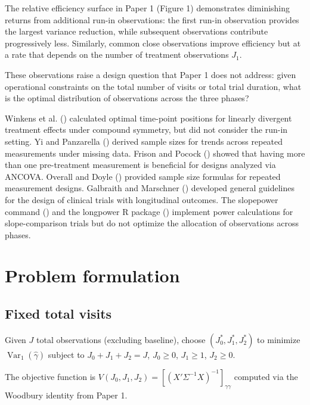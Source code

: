\documentclass[
  11pt,
]{article}
\begin{document}
The relative efficiency surface in Paper 1 (Figure 1) demonstrates
diminishing returns from additional run-in observations: the first
run-in observation provides the largest variance reduction, while
subsequent observations contribute progressively less. Similarly, common
close observations improve efficiency but at a rate that depends on the
number of treatment observations \(J_1\).

These observations raise a design question that Paper 1 does not
address: given operational constraints on the total number of visits or
total trial duration, what is the optimal distribution of observations
across the three phases?

Winkens et al. () calculated optimal
time-point positions for linearly divergent treatment effects under
compound symmetry, but did not consider the run-in setting. Yi and
Panzarella () derived sample sizes for trends
across repeated measurements under missing data. Frison and Pocock
() showed that having more than one
pre-treatment measurement is beneficial for designs analyzed via ANCOVA.
Overall and Doyle () provided sample
size formulas for repeated measurement designs. Galbraith and Marschner
() developed general guidelines for
the design of clinical trials with longitudinal outcomes. The slopepower
command () and the longpower R
package () implement power
calculations for slope-comparison trials but do not optimize the
allocation of observations across phases.

\section{Problem formulation}\label{problem-formulation}

\subsection{Fixed total visits}\label{fixed-total-visits}

Given \(J\) total observations (excluding baseline), choose
\((J_0^*, J_1^*, J_2^*)\) to minimize
\(\mathop{\mathrm{Var}}_1(\hat\gamma)\) subject to
\(J_0 + J_1 + J_2 = J\), \(J_0 \ge 0\), \(J_1 \ge 1\), \(J_2 \ge 0\).

The objective function is
\(V(J_0, J_1, J_2) = [(X'\Sigma^{-1}X)^{-1}]_{\gamma\gamma}\) computed
via the Woodbury identity from Paper 1.
\end{document}
